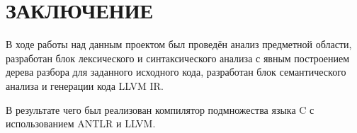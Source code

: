 \section*{ЗАКЛЮЧЕНИЕ}

В ходе работы над данным проектом был проведён анализ предметной области, разработан блок лексического и синтаксического анализа с явным построением дерева разбора для заданного исходного кода, разработан блок семантического анализа и генерации кода LLVM IR.

В результате чего был реализован компилятор подмножества языка C с использованием ANTLR и LLVM.

\pagebreak
